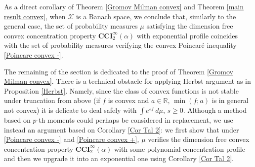 \documentclass[11pt]{amsart}
\numberwithin{equation}{section}
\begin{document}
As a direct corollary of Theorem \ref{Gromov Milman convex} and Theorem \ref{main result convex}, when ${\mathcal{X}}$ is a  Banach space, we conclude that, similarly to the general case, the set of probability measures $\mu$ satisfying  the dimension free convex concentration property $\mathbf{CCI}_2^\infty(\alpha)$ with exponential profile coincides  with the set of probability measures verifying the convex Poincar\'e inequality \eqref{Poincare convex -}.

The remaining of the section is dedicated to the proof of Theorem  \ref{Gromov Milman convex}. There is a technical obstacle for applying Herbst argument as in Proposition \ref{Herbst}. Namely, since the class of convex functions is not stable under truncation from above (if $f$ is convex and $a \in {\mathbb{R}}$, $\min(f; a)$ is in general not convex) it is delicate to deal safely with $\int e^{sf}\,d\mu$, $s\geq 0$. Although a method based on $p$-th moments could perhaps be considered in replacement,
we use instead an argument based on Corollary \ref{Cor Tal 2}: we first show that under \eqref{Poincare convex -} and \eqref{Poincare convex +}, $\mu$ verifies the dimension free convex concentration property $\mathbf{CCI}_2^\infty(\alpha)$ with some polynomial concentration profile and then we upgrade it into an exponential one using Corollary \ref{Cor Tal 2}.
\end{document}
